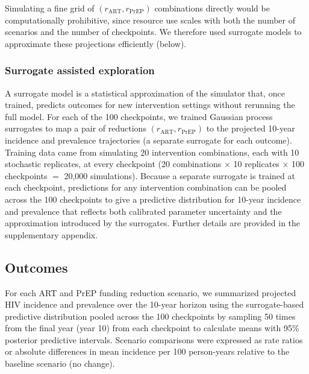 \documentclass[preprint,12pt]{elsarticle}
\begin{document}
Simulating a fine grid of $(r_{\mathrm{ART}}, r_{\mathrm{PrEP}})$ combinations directly would be computationally prohibitive, since resource use scales with both the number of scenarios and the number of checkpoints. We therefore used surrogate models to approximate these projections efficiently (below).

\subsubsection{Surrogate assisted exploration}

A surrogate model is a statistical approximation of the simulator that, once trained, predicts outcomes for new intervention settings without rerunning the full model. For each of the 100 checkpoints, we trained Gaussian process surrogates \cite{gramacy_surrogates_2020} to map a pair of reductions $(r_{\mathrm{ART}}, r_{\mathrm{PrEP}})$ to the projected 10-year incidence and prevalence trajectories (a separate surrogate for each outcome). Training data came from simulating 20 intervention combinations, each with 10 stochastic replicates, at every checkpoint (20 combinations $\times$ 10 replicates $\times$ 100 checkpoints $=$ 20{,}000 simulations). Because a separate surrogate is trained at each checkpoint, predictions for any intervention combination can be pooled across the 100 checkpoints to give a predictive distribution for 10-year incidence and prevalence that reflects both calibrated parameter uncertainty and the approximation introduced by the surrogates. Further details are provided in the supplementary appendix.

\subsection{Outcomes}
\label{sec:methods-outcomes}
For each ART and PrEP funding reduction scenario, we summarized projected HIV incidence and prevalence over the 10-year horizon using the surrogate-based predictive distribution pooled across the 100 checkpoints by sampling 50 times from the final year (year 10) from each checkpoint to calculate means with 95\% posterior predictive intervals. Scenario comparisons were expressed as rate ratios or absolute differences in mean incidence per 100 person-years relative to the baseline scenario (no change). 


\end{document}

